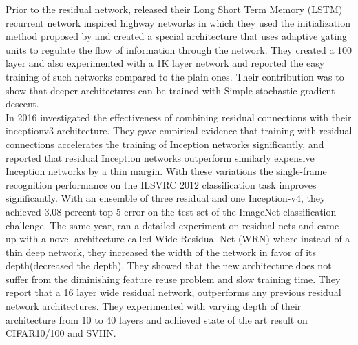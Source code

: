 \documentclass{article} \usepackage{lets_keepit_simple,times}
\begin{document}
Prior to the residual network, \cite{Srivastava_HighwayNets_2015} released their Long Short Term Memory (LSTM) recurrent network inspired highway networks in which they used the initialization method proposed by \cite{He_PReLU_2015} and created a special architecture that uses adaptive gating units to regulate the flow of information through the network. They created a 100 layer and also experimented with a 1K layer network and reported the easy training of such networks compared to the plain ones. Their contribution was to show that deeper architectures can be trained with Simple stochastic gradient descent.\\
In 2016 \cite{Szegedy_inceptiov4_2016} investigated the effectiveness of combining residual connections with their inceptionv3 architecture. They gave empirical evidence that training with residual connections accelerates the training of Inception networks significantly, and reported that residual Inception networks outperform similarly expensive Inception networks by a thin margin. With these variations the single-frame recognition performance on the ILSVRC 2012 classification task \cite{Russakovsky_ImageNet_2015} improves significantly. With an ensemble of three residual and one Inception-v4, they achieved 3.08 percent top-5 error on the test set of the ImageNet classification challenge. The same year, \cite{Zagoruyko_WRN_2016} ran a detailed experiment on residual nets \cite{He_ResNet_2015} and came up with a novel architecture called Wide Residual Net (WRN) where instead of a thin deep network, they increased the width of the network in favor of its depth(decreased the depth). They showed that the new architecture does not suffer from the diminishing feature reuse problem \cite{Srivastava_HighwayNets_2015} and slow training time. They report that a 16 layer wide residual network, outperforms any previous residual network architectures. They experimented with varying depth of their architecture from 10 to 40 layers and achieved state of the art result on CIFAR10/100 and SVHN. 
\end{document}
